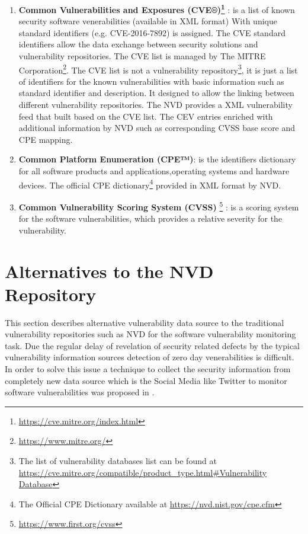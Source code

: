 \documentclass{llncs}
\begin{document}
 \begin{enumerate}
 \item \textbf{Common Vulnerabilities and Exposures (CVE®)\footnote{\url{https://cve.mitre.org/index.html}}} : is a list of known security software venerabilities (available in XML format) With unique standard identifiers (e.g. CVE-2016-7892) is assigned. The CVE standard identifiers allow the data exchange between security solutions and vulnerability repositories. The CVE list is managed by The MITRE Corporation\footnote{\url{https://www.mitre.org/}}.
 \newpage
 The CVE list is not a vulnerability repository\footnote{The list of vulnerability databases list can be found at \url{https://cve.mitre.org/compatible/product_type.html\#Vulnerability Database}}, it is just a list of identifiers for the known vulnerabilities with basic information such as standard identifier and description. It designed to allow the linking between different vulnerability repositories. The NVD provides a XML vulnerability feed that built based on the CVE list. The CEV entries enriched with additional information by NVD such as corresponding CVSS base score and CPE mapping.    
 
 \item \textbf{Common Platform Enumeration (CPE™)}: is the identifiers dictionary for all software products and applications,operating systems and hardware devices. The official CPE dictionary\footnote{The Official CPE Dictionary available at \url{https://nvd.nist.gov/cpe.cfm}} provided in XML format by NVD.
  
 \item \textbf{Common Vulnerability Scoring System (CVSS)} \footnote{\url{https://www.first.org/cvss}} : is a scoring system for the software  vulnerabilities, which provides a relative severity for the vulnerability.
 \end{enumerate}
 

\section{Alternatives to the NVD Repository}

\par This section describes alternative vulnerability data source to the traditional vulnerability repositories such as NVD for the software vulnerability monitoring task. Due the regular delay of revelation of security related defects by the typical vulnerability information sources detection of zero day venerabilities is difficult.  In order to solve this issue a technique to collect the security information from completely new data source which is the Social Media like Twitter to monitor software vulnerabilities was proposed in \cite{paper2}.
\end{document}
